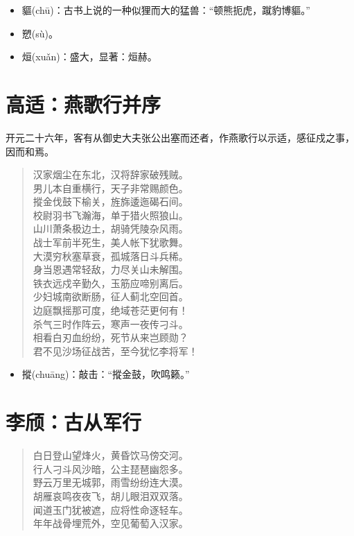 \documentclass[12pt,oneside]{book}
\newenvironment{shici}{
\begin{verse}
\centering\large\hspace{12pt}}
{\end{verse}}
\begin{document}
\begin{itemize}
\item 貙(chū)：古书上说的一种似狸而大的猛兽：“顿熊扼虎，蹴豹博貙。”
\item 愬(sù)。
\item 烜(xuǎn)：盛大，显著：烜赫。
\end{itemize}

\chapter{高适：燕歌行并序}
开元二十六年，客有从御史大夫张公出塞而还者，作燕歌行以示适，感征戍之事，因而和焉。

\begin{shici}
汉家烟尘在东北，汉将辞家破残贼。\\
男儿本自重横行，天子非常赐颜色。\\
摐金伐鼓下榆关，旌旆逶迤碣石间。\\
校尉羽书飞瀚海，单于猎火照狼山。\\
山川萧条极边土，胡骑凭陵杂风雨。\\
战士军前半死生，美人帐下犹歌舞。\\
大漠穷秋塞草衰，孤城落日斗兵稀。\\
身当恩遇常轻敌，力尽关山未解围。\\
铁衣远戍辛勤久，玉筋应啼别离后。\\
少妇城南欲断肠，征人蓟北空回首。\\
边庭飘摇那可度，绝域苍茫更何有！\\
杀气三时作阵云，寒声一夜传刁斗。\\
相看白刃血纷纷，死节从来岂顾勋？\\
君不见沙场征战苦，至今犹忆李将军！
\end{shici}

\begin{itemize}
\item 摐(chuāng)：敲击：“摐金鼓，吹鸣籁。”
\end{itemize}


\chapter{李颀：古从军行}
\begin{shici}
白日登山望烽火，黄昏饮马傍交河。\\
行人刁斗风沙暗，公主琵琶幽怨多。\\
野云万里无城郭，雨雪纷纷连大漠。\\
胡雁哀鸣夜夜飞，胡儿眼泪双双落。\\
闻道玉门犹被遮，应将性命逐轻车。\\
年年战骨埋荒外，空见葡萄入汉家。
\end{shici}
\end{document}
